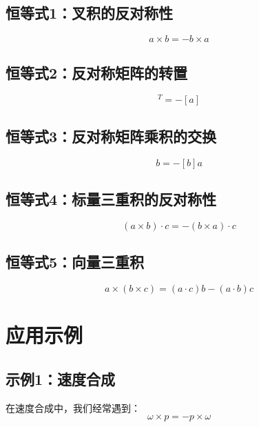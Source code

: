 \documentclass[12pt,a4paper]{article}
\begin{document}
\subsection{恒等式1：叉积的反对称性}

\begin{equation}
a \times b = -b \times a
\end{equation}

\subsection{恒等式2：反对称矩阵的转置}

\begin{equation}
[a]^T = -[a]
\end{equation}

\subsection{恒等式3：反对称矩阵乘积的交换}

\begin{equation}
[a] b = -[b] a
\end{equation}

\subsection{恒等式4：标量三重积的反对称性}

\begin{equation}
(a \times b) \cdot c = -(b \times a) \cdot c
\end{equation}

\subsection{恒等式5：向量三重积}

\begin{equation}
a \times (b \times c) = (a \cdot c) b - (a \cdot b) c
\end{equation}

\section{应用示例}

\subsection{示例1：速度合成}

在速度合成中，我们经常遇到：
\begin{equation}
\omega \times p = -p \times \omega
\end{equation}
\end{document}

